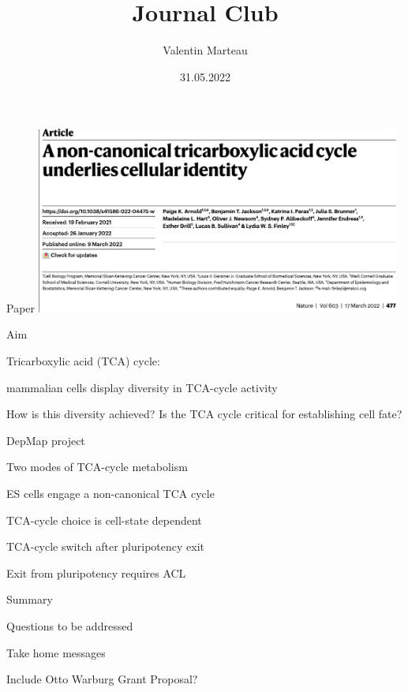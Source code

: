 \documentclass[10pt, aspectratio=169]{beamer}
\title{Journal Club}
\author{Valentin Marteau}
\date{31.05.2022}
\begin{document}
\frame{\titlepage}

\begin{frame}{Paper}
\centering
\includegraphics[width=0.9\textwidth]{figures/Arnold_2022_title.pdf}
\end{frame}


\begin{frame}{Aim}

Tricarboxylic acid (TCA) cycle: 

mammalian cells display diversity in TCA-cycle activity

How is this diversity achieved?
Is the TCA cycle critical for establishing cell fate?

\end{frame}

\begin{frame}{DepMap project}

\end{frame}

\begin{frame}{Two modes of TCA-cycle metabolism}

\end{frame}

\begin{frame}{ES cells engage a non-canonical TCA cycle}

\end{frame}

\begin{frame}{TCA-cycle choice is cell-state dependent}

\end{frame}

\begin{frame}{TCA-cycle switch after pluripotency exit}

\end{frame}

\begin{frame}{Exit from pluripotency requires ACL}

\end{frame}

\begin{frame}{Summary}

\end{frame}

\begin{frame}{Questions to be addressed}

\end{frame}

\begin{frame}{Take home messages}

Include Otto Warburg Grant Proposal?
\end{frame}
\end{document}
